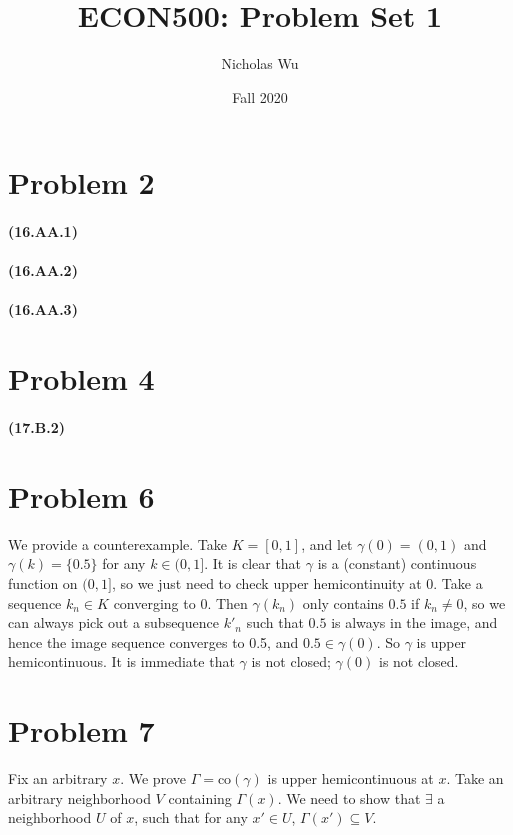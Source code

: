 \documentclass[10pt,letter]{article}
\begin{document}


\title{ECON500: Problem Set 1}

\author{Nicholas Wu}

\date{Fall 2020}

\maketitle


\section*{Problem 2}
\paragraph{(16.AA.1)}
\paragraph{(16.AA.2)}
\paragraph{(16.AA.3)}
\section*{Problem 4}
\paragraph{(17.B.2)}
\section*{Problem 6}
We provide a counterexample. Take $K = [0,1]$, and let $\gamma(0) = (0,1)$ and $\gamma(k) = \{ 0.5 \} $ for any $k \in (0, 1]$. It is clear that $\gamma$ is a (constant) continuous function on $(0,1]$, so we just need to check upper hemicontinuity at 0. Take a sequence $k_n \in K$ converging to 0. Then $\gamma(k_n)$ only contains $0.5$ if $k_n \neq 0$, so we can always pick out a subsequence $k'_n$ such that $0.5$ is always in the image, and hence the image sequence converges to 0.5, and $0.5 \in \gamma(0)$. So $\gamma$ is upper hemicontinuous. It is immediate that $\gamma$ is not closed; $\gamma(0)$ is not closed.
\section*{Problem 7}
Fix an arbitrary $x$. We prove $\Gamma = \text{co} (\gamma)$ is upper hemicontinuous at $x$. Take an arbitrary neighborhood $V$ containing $\Gamma(x)$.  We need to show that $\exists$ a neighborhood $U$ of $x$, such that for any $x' \in U$, $\Gamma(x') \subseteq V$.
\end{document}
